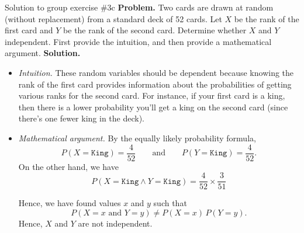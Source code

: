 \documentclass[10pt]{beamer}
\begin{document}
\begin{frame}{Solution to group exercise \#3c}
\small 
\textbf{Problem.} Two cards are drawn at random (without replacement) from a standard deck of 52 cards. Let $X$ be the rank of the first card and $Y$ be the rank of the second card. Determine whether $X$ and $Y$ independent. First provide the intuition, and then provide a mathematical argument.  
\vfill 
\vspace{-.2cm}
\textbf{Solution.}
\vspace{-.2cm}
\begin{itemize}
\item \textit{Intuition.} These random variables should be dependent because knowing the rank of the first card provides information about the probabilities of getting various ranks for the second card.  For instance, if your first card is a king, then there is a lower probability you'll get a king on the second card (since there's one fewer king in the deck).
\vfill 
\item \textit{Mathematical argument.}  By the equally likely probability formula,
\[P(X=\texttt{King}) = \frac{4}{52} \qquad \text{and} \qquad  P(Y=\texttt{King}) = \frac{4}{52} .\]
On the other hand, we have
\[ P(X=\texttt{King} \land  Y=\texttt{King}) = \frac{4}{52} \times \frac{3}{51}\]

Hence, we have found values $x$ and $y$ such that
\[P(X=x \text{ and } Y=y) \neq P(X=x) \, P(Y=y). \]
Hence, $X$ and $Y$ are not independent.


\end{itemize}

\end{frame}
\end{document}
